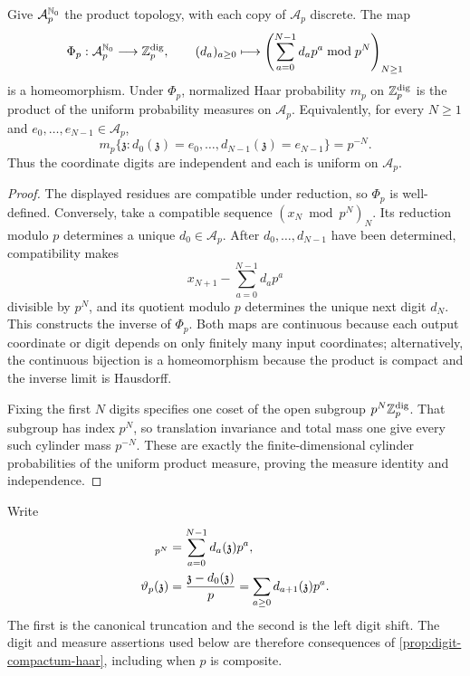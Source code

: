 \begin{proposition}
\label{prop:digit-compactum-haar}
Give $\mathcal A_p^{\mathbb N_0}$ the product topology, with each copy of
$\mathcal A_p$ discrete.  The map
\[
 \Phi_p:\mathcal A_p^{\mathbb N_0}\longrightarrow\mathbb Z_p^{\mathrm{dig}},
 \qquad
 (d_a)_{a\geq0}\longmapsto
 \left(\sum_{a=0}^{N-1}d_ap^a\bmod p^N\right)_{N\geq1}
\]
is a homeomorphism.  Under $\Phi_p$, normalized Haar probability $m_p$ on
$\mathbb Z_p^{\mathrm{dig}}$ is the product of the uniform probability measures on
$\mathcal A_p$.  Equivalently, for every $N\geq1$ and
$e_0,\ldots,e_{N-1}\in\mathcal A_p$,
\begin{equation}
\label{eq:digit-cylinder-mass}
 m_p\{\mathfrak z:d_0(\mathfrak z)=e_0,\ldots,
                   d_{N-1}(\mathfrak z)=e_{N-1}\}=p^{-N}.
\end{equation}
Thus the coordinate digits are independent and each is uniform on
$\mathcal A_p$.
\end{proposition}

\begin{proof}
The displayed residues are compatible under reduction, so $\Phi_p$ is
well-defined.  Conversely, take a compatible sequence
$(x_N\bmod p^N)_N$.  Its reduction modulo $p$ determines a unique
$d_0\in\mathcal A_p$.  After $d_0,\ldots,d_{N-1}$ have been determined,
compatibility makes
\[
 x_{N+1}-\sum_{a=0}^{N-1}d_ap^a
\]
divisible by $p^N$, and its quotient modulo $p$ determines the unique next
digit $d_N$.  This constructs the inverse of $\Phi_p$.  Both maps are
continuous because each output coordinate or digit depends on only finitely
many input coordinates; alternatively, the continuous bijection is a
homeomorphism because the product is compact and the inverse limit is
Hausdorff.

Fixing the first $N$ digits specifies one coset of the open subgroup
$p^N\mathbb Z_p^{\mathrm{dig}}$.  That subgroup has index $p^N$, so translation
invariance and total mass one give every such cylinder mass $p^{-N}$.
These are exactly the finite-dimensional cylinder probabilities of the
uniform product measure, proving the measure identity and independence.
\end{proof}

Write
\begin{align}
 [\mathfrak z]_{p^N}&=\sum_{a=0}^{N-1}d_a(\mathfrak z)p^a,\\
 \sh(\mathfrak z)&=\frac{\mathfrak z-d_0(\mathfrak z)}p
                  =\sum_{a\geq0}d_{a+1}(\mathfrak z)p^a.
\end{align}
The first is the canonical truncation and the second is the left digit shift.
The digit and measure assertions used below are therefore consequences of
\cref{prop:digit-compactum-haar}, including when $p$ is composite.

